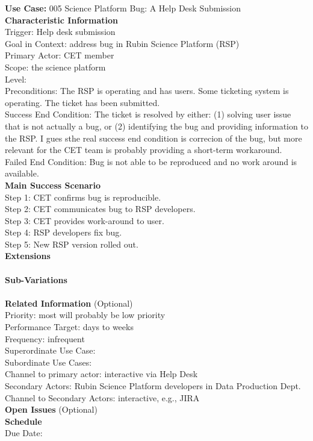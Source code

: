 {\bf Use Case:} 005 Science Platform Bug: A Help Desk Submission  \\

{\bf Characteristic Information} \\
Trigger: Help desk submission \\
Goal in Context: address bug in Rubin Science Platform (RSP)\\
Primary Actor: CET member \\
Scope: the science platform \\
Level: \\
Preconditions: The RSP is operating and has users.  Some ticketing system is operating.  The ticket has been submitted. \\
Success End Condition: The ticket is resolved by either: (1) solving user issue that is not actually a bug, or (2) identifying the bug and providing information to the RSP.  I gues sthe real success end condition is correcion of the bug, but more relevant for the CET team is probably providing a short-term workaround. \\
Failed End Condition: Bug is not able to be reproduced and no work around is available. \\

{\bf Main Success Scenario} \\
Step 1: CET confirms bug is reproducible. \\
Step 2: CET communicates bug to RSP developers. \\
Step 3: CET provides work-around to user. \\
Step 4: RSP developers fix bug. \\
Step 5: New RSP version rolled out. \\

{\bf Extensions} \\
\\

{\bf Sub-Variations} \\
\\

{\bf Related Information} (Optional) \\
Priority: most will probably be low priority \\
Performance Target: days to weeks \\
Frequency: infrequent \\
Superordinate Use Case:  \\
Subordinate Use Cases: \\
Channel to primary actor: interactive via Help Desk \\
Secondary Actors: Rubin Science Platform developers in Data Production Dept. \\
Channel to Secondary Actors: interactive, e.g., JIRA \\

{\bf Open Issues} (Optional) \\

{\bf Schedule} \\
Due Date: \\
